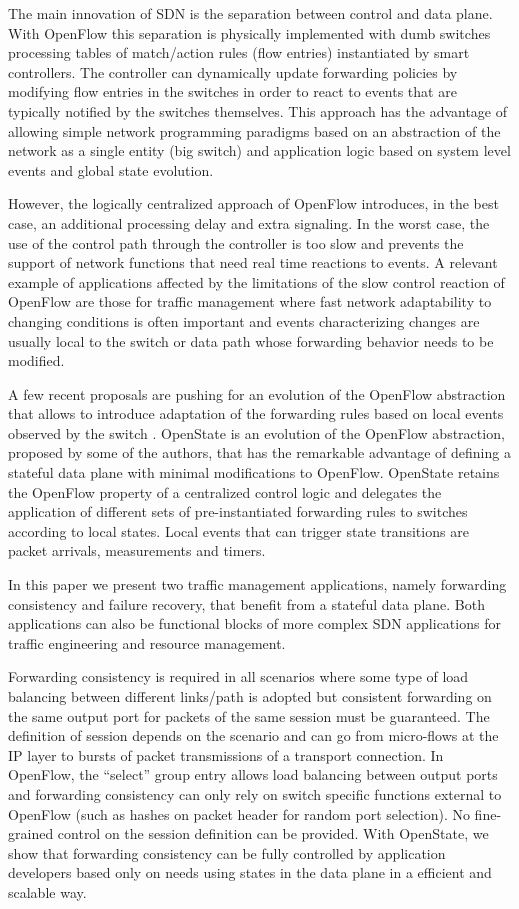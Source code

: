 \documentclass[10pt,conference]{IEEEtran}
\begin{document}
The main innovation of SDN is the separation between control and data plane. With OpenFlow this separation is physically implemented with dumb switches processing tables of match/action rules (flow entries) instantiated by smart controllers. The controller can dynamically update forwarding policies by modifying flow entries in the switches in order to react to events that are typically notified by the switches themselves. This approach has the advantage of allowing simple network programming paradigms based on an abstraction of the network as a single entity (big switch) and application logic based on system level events and global state evolution. 

However, the logically centralized approach of OpenFlow introduces, in the best case, an additional processing delay and extra signaling. In the worst case, the use of the control path through the controller is too slow and prevents the support of network functions that need real time reactions to events. A relevant example of applications affected by the limitations of the slow control reaction of OpenFlow are those for traffic management where fast network adaptability to changing conditions is often important and events characterizing changes are usually local to the switch or data path whose forwarding behavior needs to be modified.

A few recent proposals are pushing for an evolution of the OpenFlow abstraction that allows to introduce adaptation of the forwarding rules based on local events observed by the switch \cite{Bos14,Mos14}. OpenState \cite{bianchi14} is an evolution of the OpenFlow abstraction, proposed by some of the authors, that has the remarkable advantage of defining a stateful data plane with minimal modifications to OpenFlow. OpenState retains the OpenFlow property of a centralized control logic and delegates the application of different sets of pre-instantiated forwarding rules to switches according to local states. Local events that can trigger state transitions are packet arrivals, measurements and timers.

In this paper we present two traffic management applications, namely forwarding consistency and failure recovery, that benefit from a stateful data plane. Both applications can also be functional blocks of more complex SDN applications for traffic engineering and resource management.

Forwarding consistency is required in all scenarios where some type of load balancing between different links/path is adopted but consistent forwarding on the same output port for packets of the same session must be guaranteed. The definition of session depends on the scenario and can go from micro-flows at the IP layer to bursts of packet transmissions of a transport connection. In OpenFlow, the ``select'' group entry allows load balancing between output ports and forwarding consistency can only rely on switch specific functions external to OpenFlow (such as hashes on packet header for random port selection). No fine-grained control on the session definition can be provided. With OpenState, we show that forwarding consistency can be fully controlled by application developers based only on needs using states in the data plane in a efficient and scalable way.
\end{document}
